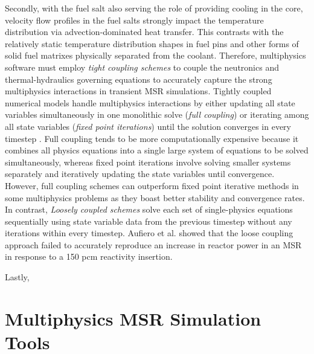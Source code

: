 Secondly, with the fuel
salt also serving the role of providing cooling in the core, velocity flow
profiles in the fuel salts strongly impact the temperature distribution via
advection-dominated heat transfer. This contrasts with the relatively static
temperature distribution shapes in fuel pins and other forms of solid fuel
matrixes physically separated from the coolant. Therefore, multiphysics
software must employ \textit{tight coupling schemes} to couple the neutronics
and thermal-hydraulics governing equations to accurately capture the strong
multiphysics interactions in transient \gls{MSR} simulations. Tightly coupled
numerical models handle multiphysics interactions by either updating all state
variables simultaneously in one monolithic solve (\textit{full coupling}) or
iterating among all state variables (\textit{fixed point iterations}) until the
solution converges in every timestep \cite{keyes_multiphysics_2013}. Full
coupling tends to be more computationally expensive because it combines all
physics equations into a single large system of equations to be solved
simultaneously, whereas fixed point iterations involve solving smaller systems
separately and iteratively updating the state variables until convergence.
However, full coupling schemes can outperform fixed point iterative methods in
some multiphysics problems as they boast better stability and convergence
rates. In contrast, \textit{Loosely coupled schemes} solve each set of
single-physics equations sequentially using state variable data from the
previous timestep without any iterations within every timestep. Aufiero et al.
\cite{aufiero_development_2014} showed that the loose coupling approach failed
to accurately reproduce an increase in reactor power in an \gls{MSR} in
response to a 150 pcm reactivity insertion.

Lastly, 

\section{Multiphysics MSR Simulation Tools}

